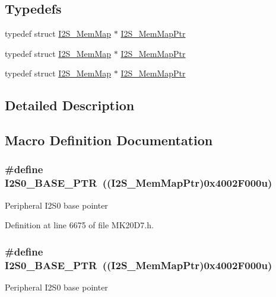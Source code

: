 \subsection*{Typedefs}
\begin{DoxyCompactItemize}
\item 
typedef struct \hyperlink{struct_i2_s___mem_map}{I2\+S\+\_\+\+Mem\+Map} $\ast$ \hyperlink{group___i2_s___peripheral_ga13144089ddabdfb4b30ae97b2ac9c859}{I2\+S\+\_\+\+Mem\+Map\+Ptr}
\item 
typedef struct \hyperlink{struct_i2_s___mem_map}{I2\+S\+\_\+\+Mem\+Map} $\ast$ \hyperlink{group___i2_s___peripheral_ga13144089ddabdfb4b30ae97b2ac9c859}{I2\+S\+\_\+\+Mem\+Map\+Ptr}
\item 
typedef struct \hyperlink{struct_i2_s___mem_map}{I2\+S\+\_\+\+Mem\+Map} $\ast$ \hyperlink{group___i2_s___peripheral_ga13144089ddabdfb4b30ae97b2ac9c859}{I2\+S\+\_\+\+Mem\+Map\+Ptr}
\end{DoxyCompactItemize}


\subsection{Detailed Description}


\subsection{Macro Definition Documentation}
\subsubsection[{\texorpdfstring{I2\+S0\+\_\+\+B\+A\+S\+E\+\_\+\+P\+TR}{I2S0_BASE_PTR}}]{\setlength{\rightskip}{0pt plus 5cm}\#define I2\+S0\+\_\+\+B\+A\+S\+E\+\_\+\+P\+TR~(({\bf I2\+S\+\_\+\+Mem\+Map\+Ptr})0x4002\+F000u)}\hypertarget{group___i2_s___peripheral_ga2eac5d85244610150239927c71b2e147}{}\label{group___i2_s___peripheral_ga2eac5d85244610150239927c71b2e147}
Peripheral I2\+S0 base pointer 

Definition at line 6675 of file M\+K20\+D7.\+h.

\subsubsection[{\texorpdfstring{I2\+S0\+\_\+\+B\+A\+S\+E\+\_\+\+P\+TR}{I2S0_BASE_PTR}}]{\setlength{\rightskip}{0pt plus 5cm}\#define I2\+S0\+\_\+\+B\+A\+S\+E\+\_\+\+P\+TR~(({\bf I2\+S\+\_\+\+Mem\+Map\+Ptr})0x4002\+F000u)}\hypertarget{group___i2_s___peripheral_ga2eac5d85244610150239927c71b2e147}{}\label{group___i2_s___peripheral_ga2eac5d85244610150239927c71b2e147}
Peripheral I2\+S0 base pointer 


